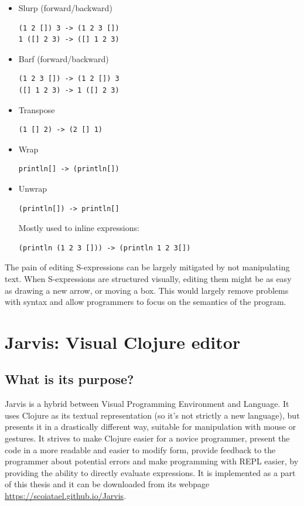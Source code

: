 \documentclass[11pt]{scrartcl}
\begin{document}
\begin{itemize}
  \item Slurp (forward/backward)
    \begin{lstlisting}
(1 2 []) 3 -> (1 2 3 [])
1 ([] 2 3) -> ([] 1 2 3)
    \end{lstlisting}
  \item Barf (forward/backward)
\begin{lstlisting}
(1 2 3 []) -> (1 2 []) 3
([] 1 2 3) -> 1 ([] 2 3)
\end{lstlisting}
  \item  Transpose
\begin{lstlisting}
(1 [] 2) -> (2 [] 1)
\end{lstlisting}
  \item Wrap
\begin{lstlisting}
println[] -> (println[])
\end{lstlisting}
  \item Unwrap
\begin{lstlisting}
(println[]) -> println[]
\end{lstlisting}
Mostly used to inline expressions:
\begin{lstlisting}
(println (1 2 3 [])) -> (println 1 2 3[])
\end{lstlisting}
\end{itemize}

The pain of editing S-expressions can be largely mitigated by not manipulating
text.
When S-expressions are structured visually, editing them might be as easy as
drawing a new arrow, or moving a box.
This would largely remove problems with syntax and allow programmers to focus on
the semantics of the program.


\section{Jarvis: Visual Clojure editor}
\subsection{What is its purpose?}
Jarvis is a hybrid between Visual Programming Environment and Language.
It uses Clojure as its textual representation (so it’s not strictly a new
language), but presents it in a drastically different way, suitable for
manipulation with mouse or gestures.
It strives to make Clojure easier for a novice programmer, present the code in a
more readable and easier to modify form, provide feedback to the programmer
about potential errors and make programming with REPL easier, by providing the
ability to directly evaluate expressions.
It is implemented as a part of this thesis and it can be downloaded from its
webpage \url{https://scoiatael.github.io/Jarvis}.
\end{document}
